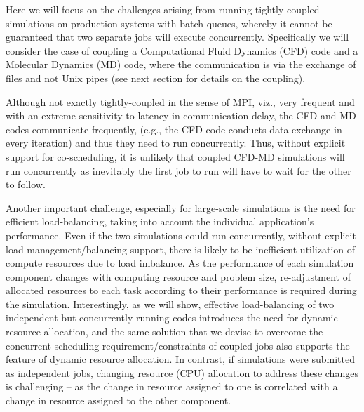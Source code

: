 \documentclass[conference,final]{IEEEtran}
\newcommand{\jhanote}[1]{ {\textcolor{red} { ***Jha: #1 }}}
\newcommand{\jhanote}[1]{}
\begin{document}
Here we will focus on the challenges arising from running
tightly-coupled simulations on production systems with batch-queues,
whereby it cannot be guaranteed that two separate jobs will execute
concurrently. Specifically we will consider the case of coupling a
Computational Fluid Dynamics (CFD) code and a Molecular Dynamics (MD)
code, where the communication is via the exchange of files and not
Unix pipes (see next section for details on the coupling).


Although not exactly tightly-coupled in the sense of MPI, viz., very
frequent and with an extreme sensitivity to latency in communication
delay, the CFD and MD codes communicate frequently, (e.g., the CFD
code conducts data exchange in every iteration) and thus they need to
run concurrently. Thus, without explicit support for co-scheduling, it
is unlikely that coupled CFD-MD simulations will run concurrently as
inevitably the first job to run will have to wait for the other to
follow.


Another important challenge, especially for large-scale simulations is
the need for efficient load-balancing, taking into account the
individual application's performance. Even if the two simulations could
run concurrently, without explicit load-management/balancing support,
there is likely to be inefficient utilization of compute resources due
to load imbalance. As the performance of each simulation component
changes with computing resource and problem size, re-adjustment of
allocated resources to each task according to their performance is
required during the simulation. Interestingly, as we will show,
effective load-balancing of two independent but concurrently running
codes introduces the need for dynamic resource allocation, and the
same solution that we devise to overcome the concurrent scheduling
requirement/constraints of coupled jobs also supports the feature of
dynamic resource allocation. In contrast, if simulations were
submitted as independent jobs, changing resource (CPU) allocation to
address these changes is challenging -- as the change in resource
assigned to one is correlated with a change in resource assigned to
the other component.
\end{document}
